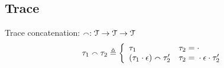 %
\subsection{Trace}
%
%
%
%
%
%
Trace concatenation: $\smallfrown: \mathcal{T} \to \mathcal{T} \to \mathcal{T}$
\[
  \trace_1 \tracecat \trace_2 \triangleq
  \left\{
  \begin{array}{ll} 
    \trace_1                                      & \trace_2 =  \cdot \\
    (\trace_1 \cdot \event) \tracecat \trace_2'   & \trace_2 =  {} \cdot \event \cdot \trace_2'\\ 
  \end{array}
  \right.
\]
